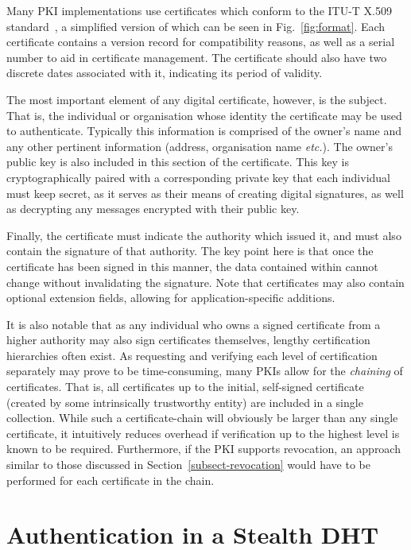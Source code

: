\documentclass{elsart3p}
\begin{document}
Many PKI implementations use certificates which conform to the ITU-T
X.509 standard~\cite{X509}, a simplified version of which can be
seen in Fig.~\ref{fig:format}. Each certificate contains a version record
for compatibility reasons, as well as a serial number to aid in certificate
management. The certificate should also have two discrete dates associated with it,
indicating its period of validity.

The most important element of any digital certificate, however, is
the subject. That is, the individual or organisation whose identity
the certificate may be used to authenticate. Typically this
information is comprised of the owner's name and any other pertinent
information (address, organisation name \emph{etc.}). The owner's
public key is also included in this section of the
certificate. This key is cryptographically paired with a
corresponding private key that each individual must keep secret, as
it serves as their means of creating digital signatures, as well as
decrypting any messages encrypted with their public key.

Finally, the certificate must indicate the authority which issued
it, and must also contain the signature of that authority. The key
point here is that once the certificate has been signed in this
manner, the data contained within cannot change without invalidating
the signature. Note that certificates may also contain optional
extension fields, allowing for application-specific additions.

It is also notable that as any individual who owns a signed
certificate from a higher authority may also sign certificates
themselves, lengthy certification hierarchies often exist. As
requesting and verifying each level of certification separately may
prove to be time-consuming, many PKIs allow for the \emph{chaining}
of certificates. That is, all certificates up to the initial,
self-signed certificate (created by some intrinsically trustworthy
entity) are included in a single collection. While such a
certificate-chain will obviously be larger than any single
certificate, it intuitively reduces overhead if verification up to
the highest level is known to be required. Furthermore, if the PKI
supports revocation, an approach similar to those discussed in
Section~\ref{subsect-revocation} would have to be performed for each
certificate in the chain.

\section{Authentication in a Stealth DHT}
\label{sect-auth}
\end{document}
